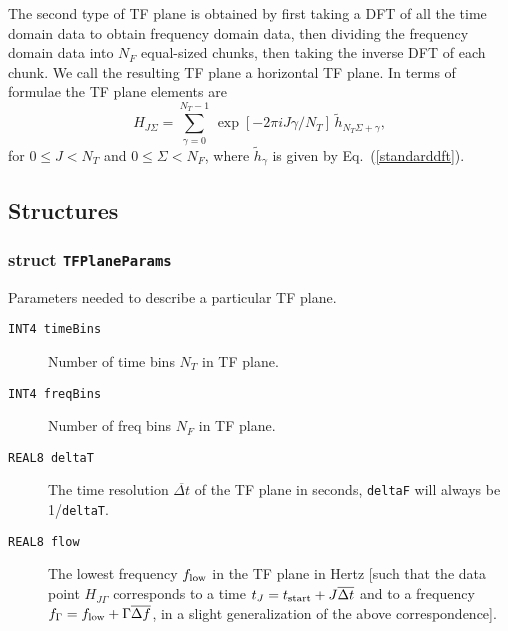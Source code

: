 The second type of TF plane is obtained by first taking a DFT of all the time
domain data to obtain frequency domain data, then dividing the frequency
domain data into $N_F$ equal-sized chunks, then taking the inverse DFT of each
chunk.  We call the resulting TF plane a horizontal TF plane. In terms of
formulae the TF plane elements are \begin{equation} H_{J\Sigma} =
\sum_{\gamma=0}^{N_T-1} \, \exp \left[ -2 \pi i J \gamma / N_T \right] \,
{\tilde h}_{N_T \Sigma + \gamma}, \label{horizontalTFP} \end{equation} for $0
\le J < N_T$ and $0 \le \Sigma < N_F$, where ${\tilde h}_\gamma$ is given by
Eq.\ (\ref{standarddft}).


\subsection*{Structures}

\subsubsection*{struct \texttt{TFPlaneParams}}

\noindent Parameters needed to describe a particular TF plane.

\begin{description}
\item[\texttt{INT4 timeBins}] Number of time bins $N_T$ in TF plane. 

\item[\texttt{INT4 freqBins}] Number of freq bins $N_F$ in TF plane.

\item[\texttt{REAL8 deltaT}] The time resolution ${\overline {\Delta t}}$ 
of the TF plane in seconds, \texttt{deltaF} will always be 1/\texttt{deltaT}.

\item[\texttt{REAL8 flow}] The lowest frequency $f_{\rm low}$ in the TF plane
in Hertz [such that the data point $H_{J\Gamma}$ corresponds to a time $t_J =
t_{\rm start} + J {\overline {\Delta t}}$ and to a frequency $f_\Gamma =
f_{\rm low} + \Gamma {\overline {\Delta f}}$, in a slight generalization of
the above correspondence].
\end{description}

